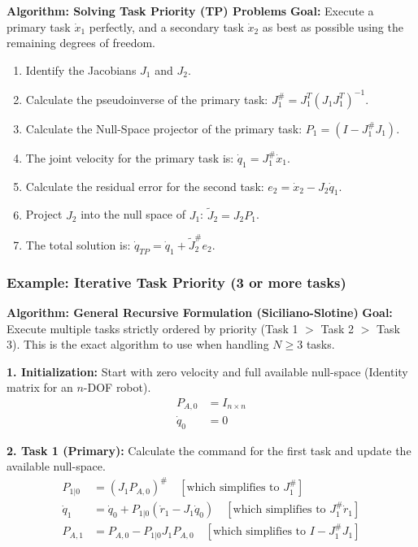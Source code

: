 \documentclass[11pt,a4paper]{article}
\begin{document}
\textbf{Algorithm: Solving Task Priority (TP) Problems}
\textbf{Goal:} Execute a primary task $\dot{x}_1$ perfectly, and a secondary task $\dot{x}_2$ as best as possible using the remaining degrees of freedom.
\begin{enumerate}
    \item Identify the Jacobians $J_1$ and $J_2$.
    \item Calculate the pseudoinverse of the primary task: $J_1^\# = J_1^T(J_1 J_1^T)^{-1}$.
    \item Calculate the Null-Space projector of the primary task: $P_1 = (I - J_1^\# J_1)$.
    \item The joint velocity for the primary task is: $\dot{q}_1 = J_1^\# \dot{x}_1$.
    \item Calculate the residual error for the second task: $e_2 = \dot{x}_2 - J_2 \dot{q}_1$.
    \item Project $J_2$ into the null space of $J_1$: $\tilde{J}_2 = J_2 P_1$.
    \item The total solution is: $\dot{q}_{TP} = \dot{q}_1 + \tilde{J}_2^\# e_2$.
\end{enumerate}

\subsubsection{Example: Iterative Task Priority (3 or more tasks)}

 \textbf{Algorithm: General Recursive Formulation (Siciliano-Slotine)}
\textbf{Goal:} Execute multiple tasks strictly ordered by priority (Task 1 $>$ Task 2 $>$ Task 3). This is the exact algorithm to use when handling $N \ge 3$ tasks.
\vspace{0.2cm}

\textbf{1. Initialization:} Start with zero velocity and full available null-space (Identity matrix for an $n$-DOF robot).
\begin{align*}
    P_{A,0} &= I_{n \times n} \\
    \dot{q}_0 &= 0
\end{align*}

\textbf{2. Task 1 (Primary):} Calculate the command for the first task and update the available null-space.
\begin{align*}
    P_{1|0} &= (J_1 P_{A,0})^\# \quad \left[ \text{which simplifies to } J_1^\# \right] \\
    \dot{q}_1 &= \dot{q}_0 + P_{1|0} (\dot{r}_1 - J_1 \dot{q}_0) \quad \left[ \text{which simplifies to } J_1^\# \dot{r}_1 \right] \\
    P_{A,1} &= P_{A,0} - P_{1|0} J_1 P_{A,0} \quad \left[ \text{which simplifies to } I - J_1^\# J_1 \right]
\end{align*}
\end{document}
